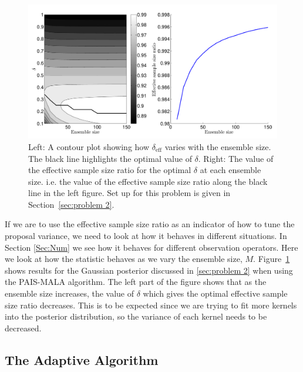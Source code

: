 \documentclass[final]{siamltex}
\begin{document}
\begin{figure}[htpb]
\begin{center}
\includegraphics[width=\textwidth]{figures/neff-M}
\caption{Left: A contour plot showing how $\delta_{\text{eff}}$ varies with the ensemble size. The black line highlights the optimal value of $\delta$. Right: The value of the effective sample size ratio for the optimal $\delta$ at each ensemble size. i.e. the value of the effective sample size ratio along the black line in the left figure. Set up for this problem is given in Section~\ref{sec:problem 2}.}
\label{fig:neff-M}
\end{center}
\end{figure}

If we are to use the effective sample size ratio as an indicator of
how to tune the proposal variance, we need to look at how it behaves
in different situations. In Section \ref{Sec:Num} we see how it behaves for different observation operators. Here we look at how the statistic behaves as we vary the ensemble size, $M$. Figure~\ref{fig:neff-M} shows results for the Gaussian posterior discussed in \ref{sec:problem 2} when using the PAIS-MALA algorithm. The left part of the figure shows that as the ensemble size increases, the value of $\delta$ which gives the optimal effective sample size ratio decreases. This is to be expected since we are trying to fit more kernels into the posterior distribution, so the variance of each kernel needs to be decreased.

\subsection{The Adaptive Algorithm}\label{sec:adapt}
\end{document}
